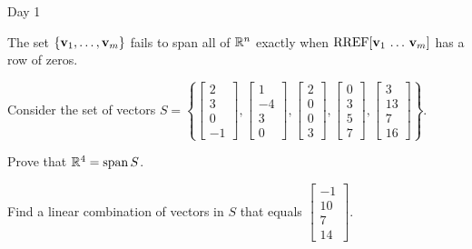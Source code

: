 \begin{applicationActivities}{Day 1}
\begin{fact}
  The set \(\{\mathbf v_1,\dots,\mathbf v_m\}\) fails to span all of \(\mathbb{R}^n\)
  exactly when \(\operatorname{RREF}[\mathbf v_1\,\dots\,\mathbf v_m]\) has a row of zeros.
\end{fact}

\begin{activity}{10}
  Consider the set of vectors \(S=\left\{
  \begin{bmatrix}2\\3\\0\\-1\end{bmatrix},
  \begin{bmatrix}1\\-4\\3\\0\end{bmatrix},
  \begin{bmatrix}2\\0\\0\\3\end{bmatrix},
  \begin{bmatrix}0\\3\\5\\7\end{bmatrix},
  \begin{bmatrix}3\\13\\7\\16\end{bmatrix}
  \right\}
  \).
  \begin{subactivity}
  Prove that
  \(\mathbb{R}^4=\operatorname{span} S\).
  \end{subactivity}
  \begin{subactivity}
  Find a linear combination of vectors in \(S\) that equals
  \(\begin{bmatrix}-1\\10\\7\\14\end{bmatrix}\).
  \end{subactivity}
\end{activity}


\end{applicationActivities}
